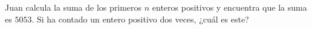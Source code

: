 Juan calcula la suma de los primeros $n$ enteros positivos y encuentra que la suma es $5053$. Si ha contado un entero positivo dos veces, ¿cuál es este?